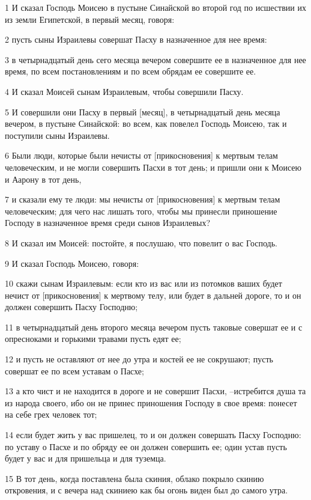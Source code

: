 \par 1 И сказал Господь Моисею в пустыне Синайской во второй год по исшествии их из земли Египетской, в первый месяц, говоря:
\par 2 пусть сыны Израилевы совершат Пасху в назначенное для нее время:
\par 3 в четырнадцатый день сего месяца вечером совершите ее в назначенное для нее время, по всем постановлениям и по всем обрядам ее совершите ее.
\par 4 И сказал Моисей сынам Израилевым, чтобы совершили Пасху.
\par 5 И совершили они Пасху в первый [месяц], в четырнадцатый день месяца вечером, в пустыне Синайской: во всем, как повелел Господь Моисею, так и поступили сыны Израилевы.
\par 6 Были люди, которые были нечисты от [прикосновения] к мертвым телам человеческим, и не могли совершить Пасхи в тот день; и пришли они к Моисею и Аарону в тот день,
\par 7 и сказали ему те люди: мы нечисты от [прикосновения] к мертвым телам человеческим; для чего нас лишать того, чтобы мы принесли приношение Господу в назначенное время среди сынов Израилевых?
\par 8 И сказал им Моисей: постойте, я послушаю, что повелит о вас Господь.
\par 9 И сказал Господь Моисею, говоря:
\par 10 скажи сынам Израилевым: если кто из вас или из потомков ваших будет нечист от [прикосновения] к мертвому телу, или будет в дальней дороге, то и он должен совершить Пасху Господню;
\par 11 в четырнадцатый день второго месяца вечером пусть таковые совершат ее и с опресноками и горькими травами пусть едят ее;
\par 12 и пусть не оставляют от нее до утра и костей ее не сокрушают; пусть совершат ее по всем уставам о Пасхе;
\par 13 а кто чист и не находится в дороге и не совершит Пасхи, --истребится душа та из народа своего, ибо он не принес приношения Господу в свое время: понесет на себе грех человек тот;
\par 14 если будет жить у вас пришелец, то и он должен совершать Пасху Господню: по уставу о Пасхе и по обряду ее он должен совершить ее; один устав пусть будет у вас и для пришельца и для туземца.
\par 15 В тот день, когда поставлена была скиния, облако покрыло скинию откровения, и с вечера над скиниею как бы огонь виден был до самого утра.
